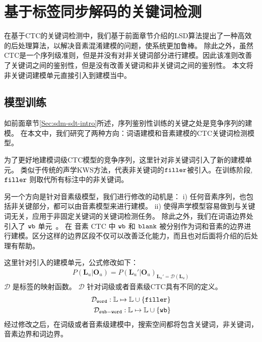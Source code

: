 \section{基于标签同步解码的关键词检测}
\label{Sec:kws-ctc}


在基于CTC的关键词检测中，我们基于前面章节介绍的LSD算法提出了一种高效的后处理算法，以解决音素混淆建模的问题，使系统更加鲁棒。
除此之外，虽然CTC是一个序列级准则，但是并没有对非关键词部分进行建模。因此该准则改善了关键词之间的鉴别性，但是没有改善关键词和非关键词之间的鉴别性。
本文将非关键词建模单元直接引入到建模当中。

\subsection{模型训练}
\label{Sec:modeltrain}

如前面章节\ref{Sec:sdm-sdt-intro}所述，序列鉴别性训练的关键之处是竞争序列的建模。
在本文中，我们研究了两种方向：词语建模和音素建模的CTC关键词检测模型。

为了更好地建模词级CTC模型的竞争序列，这里针对非关键词引入了新的建模单元。
类似于传统的声学KWS方法，代表非关键词的$\tt filler$被引入。在训练阶段, $\tt filler$ 则取代所有标注中的非关键词。

另一个方向是针对音素级模型，我们进行修改的动机是：
i) 任何音素序列，也包括非关键部分，都可以由音素模型来进行建模。
ii) 使得声学模型容易做到与关键词无关，应用于非固定关键词的关键词检测任务。
%
除此之外，我们在词语边界处引入了 $\tt wb$ 单元~\cite{zhuang-is2016}。 在 音素 CTC 中 $\tt wb$ 和 $\tt blank$ 被分别作为词和音素的边界进行建模。区分这样的边界区段不仅可以改善泛化能力，而且也对后面将介绍的后处理有帮助。

这里针对引入的建模单元，公式修改如下：
\begin{equation}
\label{equ:ctc-kw}
\begin{split}
P(\mathbf{L}_u|\mathbf{O}_u)=P(\mathbf{L}_u'|\mathbf{O}_u)_{\mathbf{L}_u' = \mathcal{D}(\mathbf{L}_u)}
\end{split}
\end{equation}
$\mathcal{D}$ 是标签的映射函数。 $\mathcal{D}$ 针对词级或者音素级CTC具有不同的定义。
\begin{equation}
\label{equ:ctc-d}
\begin{split}
\mathcal{D}_{\tt{word}}:\mathbb{L}  \mapsto \mathbb{L}  \cup \{{\tt filler}\}\\
\mathcal{D}_{\tt{sub-word}}:\mathbb{L}  \mapsto \mathbb{L}  \cup \{{\tt wb}\}
\end{split}
\end{equation}
经过修改之后，在词级或者音素级建模中，搜索空间都将包含关键词，非关键词，音素边界和词边界。

